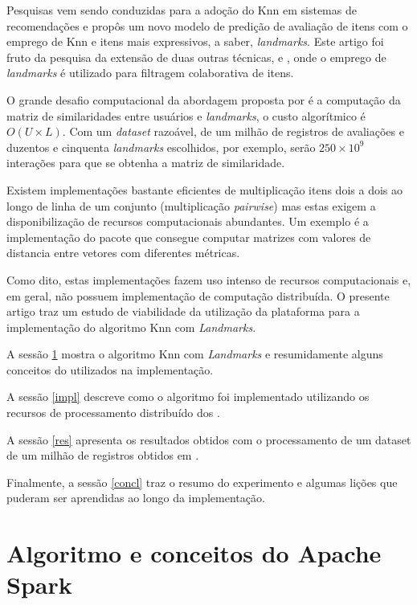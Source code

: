 \documentclass[12pt]{article}
\begin{document}
Pesquisas vem sendo conduzidas para a adoção do Knn em sistemas de recomendações e \cite{lima:18} propôs um novo modelo de predição de avaliação de itens com o emprego de Knn e itens mais expressivos, a saber, \textit{landmarks}. Este artigo foi fruto da pesquisa da extensão de duas outras técnicas, \cite{braida:15} e \cite{lima:17}, onde o emprego de \textit{landmarks} é utilizado para filtragem colaborativa de itens.

O grande desafio computacional da abordagem proposta por \cite{lima:18} é a computação da matriz de similaridades entre usuários e \textit{landmarks}, o custo algorítmico é $O(U \times L)$. Com um \textit{dataset} razoável, de um milhão de registros de avaliações e duzentos e cinquenta \textit{landmarks} escolhidos, por exemplo, serão $250 \times 10^9$ interações para que se obtenha a matriz de similaridade.

Existem implementações bastante eficientes de multiplicação itens dois a dois ao longo de linha de um conjunto (multiplicação \textit{pairwise}) mas estas exigem a disponibilização de recursos computacionais abundantes. Um exemplo é a implementação do pacote \cite{sklearnpairwise:19} que consegue computar matrizes com valores de distancia entre vetores com diferentes métricas.

Como dito, estas implementações fazem uso intenso de recursos computacionais e, em geral, não possuem implementação de computação distribuída. O presente artigo traz um estudo de viabilidade da utilização da plataforma \cite{spark:19} para a implementação do algoritmo Knn com \textit{Landmarks}.

A sessão \ref{conceitos} mostra o algoritmo Knn com \textit{Landmarks} e resumidamente alguns conceitos do \cite{spark:19} utilizados na implementação. 

A sessão \ref{impl} descreve como o algoritmo foi implementado utilizando os recursos de processamento distribuído dos \cite{spark:19}. 

A sessão \ref{res} apresenta os resultados obtidos com o processamento de um dataset de um milhão de registros obtidos em \cite{movielens:19}.

Finalmente, a sessão \ref{concl} traz o resumo do experimento e algumas lições que puderam ser aprendidas ao longo da implementação.

\section{Algoritmo e conceitos do Apache Spark}\label{conceitos}
\end{document}
